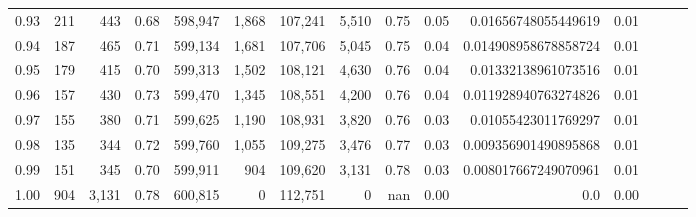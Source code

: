 \begin{tabular}{rrrrrrrrrrrrrrr}
0.93 &     211 &    443 &  0.68 &  598,947 &    1,868 &  107,241 &    5,510 &  0.75 &  0.05 &   0.01656748055449619 &      0.01 \\
0.94 &     187 &    465 &  0.71 &  599,134 &    1,681 &  107,706 &    5,045 &  0.75 &  0.04 &  0.014908958678858724 &      0.01 \\
0.95 &     179 &    415 &  0.70 &  599,313 &    1,502 &  108,121 &    4,630 &  0.76 &  0.04 &   0.01332138961073516 &      0.01 \\
0.96 &     157 &    430 &  0.73 &  599,470 &    1,345 &  108,551 &    4,200 &  0.76 &  0.04 &  0.011928940763274826 &      0.01 \\
0.97 &     155 &    380 &  0.71 &  599,625 &    1,190 &  108,931 &    3,820 &  0.76 &  0.03 &   0.01055423011769297 &      0.01 \\
0.98 &     135 &    344 &  0.72 &  599,760 &    1,055 &  109,275 &    3,476 &  0.77 &  0.03 &  0.009356901490895868 &      0.01 \\
0.99 &     151 &    345 &  0.70 &  599,911 &      904 &  109,620 &    3,131 &  0.78 &  0.03 &  0.008017667249070961 &      0.01 \\
1.00 &     904 &  3,131 &  0.78 &  600,815 &        0 &  112,751 &        0 &   nan &  0.00 &                   0.0 &      0.00 \\
\bottomrule
\end{tabular}
